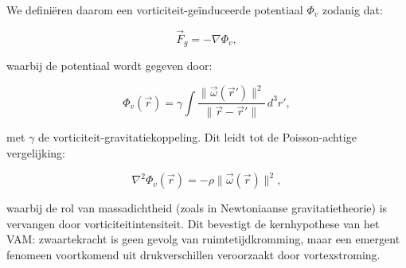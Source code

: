 We definiëren daarom een vorticiteit-geïnduceerde potentiaal $\Phi_v$ zodanig dat:

\begin{equation}
\vec{F}_g = -\nabla \Phi_v,
\end{equation}

waarbij de potentiaal wordt gegeven door:

\begin{equation}
\Phi_v(\vec{r}) = \gamma \int \frac{\|\vec{\omega}(\vec{r}')\|^2}{\|\vec{r} - \vec{r}'\|} \, d^3r',
\end{equation}

met $\gamma$ de vorticiteit-gravitatiekoppeling. Dit leidt tot de Poisson-achtige vergelijking:

\begin{equation}
\nabla^2 \Phi_v(\vec{r}) = -\rho \|\vec{\omega}(\vec{r})\|^2,
\end{equation}

waarbij de rol van massadichtheid (zoals in Newtoniaanse gravitatietheorie) is vervangen door vorticiteitintensiteit. Dit bevestigt de kernhypothese van het VAM: zwaartekracht is geen gevolg van ruimtetijdkromming, maar een emergent fenomeen voortkomend uit drukverschillen veroorzaakt door vortexstroming.
